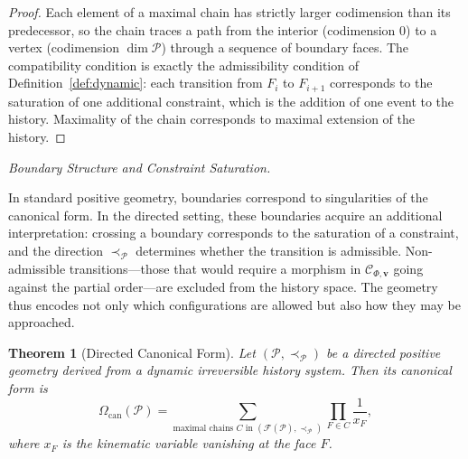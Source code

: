 \documentclass[11pt]{article}
\theoremstyle{plain}
\newtheorem{theorem}{Theorem}[section]
\theoremstyle{definition}
\theoremstyle{remark}
\newcommand{\CF}{\Omega_{\mathrm{can}}}
\newcommand{\Ccat}{\mathcal{C}_{\Phi,\mathbf{v}}}
\begin{document}
\begin{proof}
Each element of a maximal chain has strictly larger codimension than its predecessor, so the chain traces a path from the interior (codimension 0) to a vertex (codimension $\dim\mathcal{P}$) through a sequence of boundary faces. The compatibility condition is exactly the admissibility condition of Definition~\ref{def:dynamic}: each transition from $F_i$ to $F_{i+1}$ corresponds to the saturation of one additional constraint, which is the addition of one event to the history. Maximality of the chain corresponds to maximal extension of the history.
\end{proof}

\medskip\noindent\textit{Boundary Structure and Constraint Saturation.}

In standard positive geometry, boundaries correspond to singularities of the canonical form. In the directed setting, these boundaries acquire an additional interpretation: crossing a boundary corresponds to the saturation of a constraint, and the direction $\prec_{\mathcal{P}}$ determines whether the transition is admissible. Non-admissible transitions---those that would require a morphism in $\Ccat$ going against the partial order---are excluded from the history space. The geometry thus encodes not only which configurations are allowed but also how they may be approached.

\begin{theorem}[Directed Canonical Form]
\label{thm:directed-form}
Let $(\mathcal{P}, \prec_{\mathcal{P}})$ be a directed positive geometry derived from a dynamic irreversible history system. Then its canonical form is
\[
  \CF(\mathcal{P}) = \sum_{\text{maximal chains } C \text{ in } (\mathcal{F}(\mathcal{P}), \prec_{\mathcal{P}})} \prod_{F \in C} \frac{1}{x_F},
\]
where $x_F$ is the kinematic variable vanishing at the face $F$.
\end{theorem}
\end{document}
